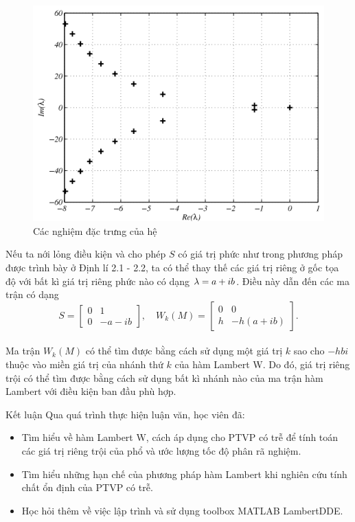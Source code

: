 \documentclass[10pt]{beamer}
\begin{document}
	\scriptsize{
	\begin{frame}
		\begin{figure}[h!]
			\centering
			\includegraphics[scale= 0.35]{"./Hinh/Hinh 3"}
			\caption[Các nghiệm đặc trưng của hệ \eqref{eq43}] {Các nghiệm đặc trưng của hệ }
			\label{fig:hinh-3}
		\end{figure}
		Nếu ta nới lỏng điều kiện và cho phép $S$ có giá trị phức như trong phương pháp được trình bày ở Định lí 2.1 - 2.2, ta có thể thay thế các giá trị riêng ở gốc tọa độ với bất kì giá trị riêng phức nào có dạng $\lambda = a + ib$. Điều này dẫn đến các ma trận có dạng
		\begin{equation*}\label{eq45}
			S = \begin{bmatrix}
				0 & 1\\
				0 & - a - ib
			\end{bmatrix}, \quad 
			W_k(M) = \begin{bmatrix}
				0 & 0\\
				h  & -h (a+ib)
			\end{bmatrix}.
		\end{equation*}\\
		Ma trận $W_k(M)$ có thể tìm được bằng cách sử dụng một giá trị $k$ sao cho $-h  bi$ thuộc vào miền giá trị của nhánh thứ $k$ của hàm Lambert W. {\color{blue} Do đó, giá trị riêng trội có thể tìm được bằng cách sử dụng bất kì nhánh nào của ma trận hàm Lambert với điều kiện ban đầu phù hợp.} 
	\end{frame}
}
	
	
	\small{
	\begin{frame}{Kết luận}
		Qua quá trình thực hiện luận văn, học viên đã:
		\begin{itemize}
			\item 
			Tìm hiểu về hàm Lambert W, cách áp dụng cho PTVP có trễ để tính toán các giá trị riêng trội của phổ và ước lượng tốc độ phân rã nghiệm.
			\item
			Tìm hiểu những hạn chế của phương pháp hàm Lambert khi nghiên cứu tính chất ổn định của PTVP có trễ.
			\item
			Học hỏi thêm về việc lập trình và sử dụng toolbox MATLAB LambertDDE.
		\end{itemize}
	\end{frame}
    }
	
\end{document}
